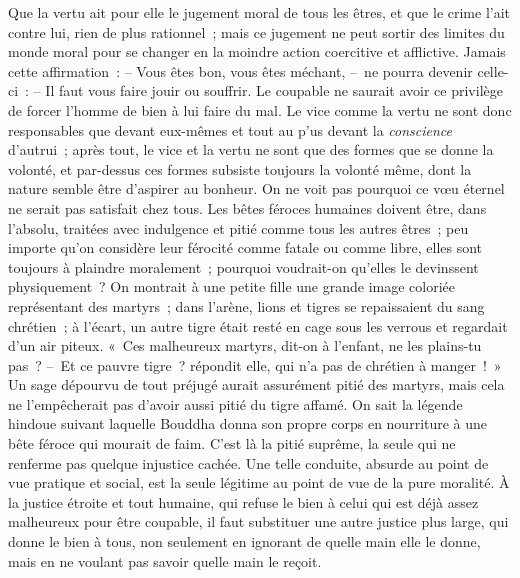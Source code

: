 \documentclass[french,twoside]{book} %
\begin{document}
Que la vertu ait pour elle le jugement moral de tous les êtres, et que le crime l’ait contre lui, rien de plus rationnel ; mais ce jugement ne peut sortir des limites du monde moral pour se changer en la moindre action coercitive et afflictive. Jamais cette affirmation : – Vous êtes bon, vous êtes méchant, – ne pourra devenir celle-ci : – Il faut vous faire jouir ou souffrir. Le coupable ne saurait avoir ce privilège de forcer l’homme de bien à lui faire du mal. Le vice comme la vertu ne sont donc responsables que devant eux-mêmes et tout au p’us devant la \emph{conscience} d’autrui ; après tout, le vice et la vertu ne sont que des formes que se donne la volonté, et par-dessus ces formes subsiste toujours la volonté même, dont la nature semble être d’aspirer au bonheur. On ne voit pas pourquoi ce vœu éternel ne serait pas satisfait chez tous. Les bêtes féroces humaines doivent être, dans l’absolu, traitées avec indulgence et pitié comme tous les autres êtres ; peu importe qu’on considère leur férocité comme fatale ou comme libre, elles sont toujours à plaindre moralement ; pourquoi voudrait-on qu’elles le devinssent physiquement ? On montrait à une petite fille une grande image coloriée représentant des martyrs ; dans l’arène, lions et tigres se repaissaient du sang chrétien ; à l’écart, un autre tigre était resté en cage sous les verrous et regardait d’un air piteux. « Ces malheureux martyrs, dit-on à l’enfant, ne les plains-tu pas ? – Et ce pauvre tigre ? répondit elle, qui n’a pas de chrétien à manger ! » Un sage dépourvu de tout préjugé aurait assurément pitié des martyrs, mais cela ne l’empêcherait pas d’avoir aussi pitié du tigre affamé. On sait la légende hindoue suivant laquelle Bouddha donna son propre corps en nourriture à une bête féroce qui mourait de faim. C’est là la pitié suprême, la seule qui ne renferme pas quelque injustice cachée. Une telle conduite, absurde au point de vue pratique et social, est la seule légitime au point de vue de la pure moralité. À la justice étroite et tout humaine, qui refuse le bien à celui qui est déjà assez malheureux pour être coupable, il faut substituer une autre justice plus large, qui donne le bien à tous, non seulement en ignorant de quelle main elle le donne, mais en ne voulant pas savoir quelle main le reçoit.\par
\end{document}
